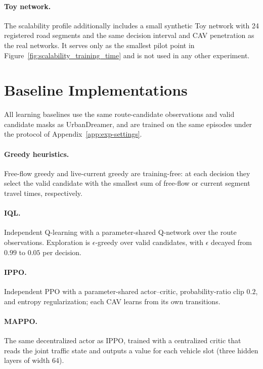 \paragraph{Toy network.}  The scalability profile additionally includes a
small synthetic Toy network with 24 registered road segments and the same
decision interval and CAV penetration as the real networks.  It serves only
as the smallest pilot point in
Figure~\ref{fig:scalability_training_time} and is not used in any other
experiment.

\section{Baseline Implementations}
\label{app:baselines}

All learning baselines use the same route-candidate observations and valid
candidate masks as UrbanDreamer, and are trained on the same episodes under
the protocol of Appendix~\ref{app:exp-settings}.

\paragraph{Greedy heuristics.}  Free-flow greedy and live-current greedy are
training-free: at each decision they select the valid candidate with the
smallest sum of free-flow or current segment travel times, respectively.

\paragraph{IQL.}  Independent Q-learning with a parameter-shared Q-network
over the route observations.  Exploration is \(\epsilon\)-greedy over valid
candidates, with \(\epsilon\) decayed from \(0.99\) to \(0.05\) per decision.

\paragraph{IPPO.}  Independent PPO with a parameter-shared actor--critic,
probability-ratio clip \(0.2\), and entropy regularization; each CAV learns
from its own transitions.

\paragraph{MAPPO.}  The same decentralized actor as IPPO, trained with a
centralized critic that reads the joint traffic state and outputs a value for
each vehicle slot (three hidden layers of width 64).

